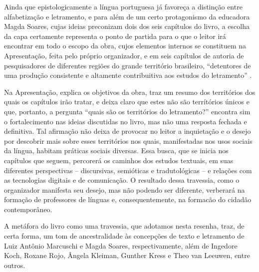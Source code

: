 \documentclass[portuguese]{textolivre}
\begin{document}
Ainda que epistologicamente a língua portuguesa já favoreça a distinção entre alfabetização e letramento, e para além de um certo protagonismo da educadora Magda Soares, cujas ideias preconizam dois dos seis capítulos do livro, a escolha da capa certamente representa o ponto de partida para o que o leitor irá encontrar em todo o escopo da obra, cujos elementos internos se constituem na Apresentação, feita pelo próprio organizador, e em seis capítulos de autoria de pesquisadores de diferentes regiões do grande território brasileiro, “detentores de uma produção consistente e altamente contribuitiva aos estudos do letramento” \cite[p. 9]{brambila2024apresentacao}.  

Na Apresentação, \textcite{brambila2024apresentacao} explica os objetivos da obra, traz um resumo dos territórios dos quais os capítulos irão tratar, e deixa claro que estes não são terrítórios únicos e que, portanto, a pergunta “quais são os territórios do letramento?” encontra sim o fortalecimento nas ideias discutidas no livro, mas não uma resposta fechada e definitiva. Tal afirmação não deixa de provocar no leitor a inquietação e o desejo por descobrir mais sobre esses territórios nos quais, manifestadas nos usos sociais da língua, habitam práticas sociais diversas. Essa busca, que se inicia nos capítulos que seguem, percorerá os caminhos dos estudos textuais, em suas diferentes perspectivas – discursivas, semióticas e tradutológicas – e relações com as tecnologias digitais e de comunicação. O resultado dessa travessia, como o organizador manifesta seu desejo, mas não podendo ser diferente, verberará na formação de professores de línguas e, consequentemente, na formacão do cidadão contemporâneo. 

A metáfora do livro como uma travessia, que adotamos nesta resenha, traz, de certa forma, um tom de ancestralidade às concepções de texto e letramento de Luiz Antônio Marcuschi e Magda Soares, respectivamente, além de Ingedore Koch, Roxane Rojo, Ângela Kleiman, Gunther Kress e Theo van Leeuwen, entre outros. 
\end{document}
